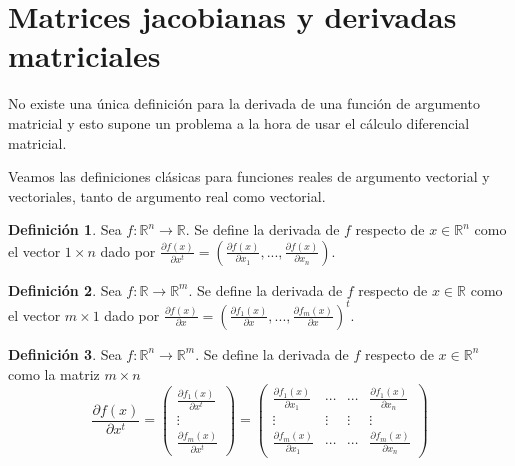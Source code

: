\documentclass{article}
\theoremstyle{theorem-style}  %
\theoremstyle{definition}
\newtheorem{definition}{Definición}[section]
\theoremstyle{example-style}
\begin{document}
\section{Matrices jacobianas y derivadas matriciales}

No existe una única definición para la derivada de una función de argumento matricial y esto supone un problema a la hora de usar el cálculo diferencial matricial.

Veamos las definiciones clásicas para funciones reales de argumento vectorial y vectoriales, tanto de argumento real como vectorial.

\begin{definition}
	Sea $f:\mathbb{R}^n\rightarrow \mathbb{R}$. Se define la derivada de $f$ respecto de $x\in \mathbb{R}^n$ como el vector $1\times n$ dado por $\displaystyle \frac{\partial f(x)}{\partial x^t} = \displaystyle \left( \frac{\partial f(x)}{\partial x_1},..., \frac{\partial f(x)}{\partial x_n} \right)$.
\end{definition}

\begin{definition}
	Sea $f:\mathbb{R}\rightarrow \mathbb{R}^m$. Se define la derivada de $f$ respecto de $x\in \mathbb{R}$ como el vector $m\times 1$ dado por $\displaystyle \frac{\partial f(x)}{\partial x} = \displaystyle \left( \frac{\partial f_1(x)}{\partial x},..., \frac{\partial f_m(x)}{\partial x} \right)^t$.
\end{definition}

\begin{definition}
	Sea $f:\mathbb{R}^n\rightarrow \mathbb{R}^m$. Se define la derivada de $f$ respecto de $x\in \mathbb{R}^n$ como la matriz $m\times n$
	$$ \frac{\partial f(x)}{\partial x^t} = \left( \begin{array}{c}
											\frac{\partial f_1(x)}{\partial x^t} \\ \vdots \\ \frac{\partial f_m(x)}{\partial x^t}
											\end{array}\right) =
											\left( \begin{array}{cccc}
											\frac{\partial f_1(x)}{\partial x_1} & \cdots & \cdots & \frac{\partial f_1(x)}{\partial x_n}\\
											\vdots & \vdots & \vdots & \vdots \\
											\frac{\partial f_m(x)}{\partial x_1} & \cdots & \cdots & \frac{\partial f_m(x)}{\partial x_n}
											\end{array}\right)$$
\end{definition}
\end{document}
